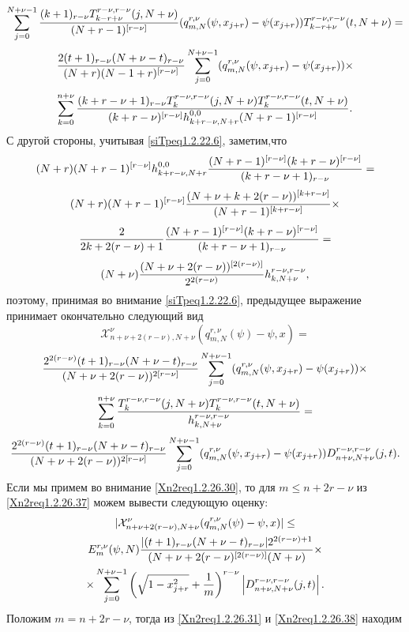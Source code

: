 $$
        \sum_{j=0}^{N+\nu-1}{(k+1)_{r-\nu}T_{k-r+\nu}^{r-\nu,r-\nu}(j,N+\nu)\over (N+r-1)^{[r-\nu]}}(q_{m,N}^{r,\nu}(\psi,x_{j+r})-\psi(x_{j+r}))
T_{k-r+\nu}^{r-\nu,r-\nu}(t,N+\nu)=
$$
$$
{2(t+1)_{r-\nu}(N+\nu-t)_{r-\nu}\over(N+r) (N-1+r)^{[r-\nu]}}\sum_{j=0}^{N+\nu-1}(q_{m,N}^{r,\nu}(\psi,x_{j+r})-\psi(x_{j+r}))\times
$$
\begin{equation}\label{Xn2req1.2.26.36}
\sum_{k=0}^{n+\nu} {(k+r-\nu+1)_{r-\nu}T_{k}^{r-\nu,r-\nu}(j,N+\nu)T_{k}^{r-\nu,r-\nu}(t,N+\nu)\over (k+r-\nu)^{[r-\nu]}h_{k+r-\nu,N+r}^{0,0}(N+r-1)^{[r-\nu]}}.
\end{equation}
С другой стороны, учитывая \eqref{siTpeq1.2.22.6}, заметим,что
$$
(N+r)(N+r-1)^{[r-\nu]}h_{k+r-\nu,N+r}^{0,0}{(N+r-1)^{[r-\nu]}(k+r-\nu)^{[r-\nu]}\over(k+r-\nu+1)_{r-\nu}}=
$$
$$
(N+r)(N+r-1)^{[r-\nu]}{(N+\nu+k+2(r-\nu))^{[k+r-\nu]}\over
(N+r-1)^{[k+r-\nu]}}\times
$$
$$
{2\over 2k+2(r-\nu)+1}{(N+r-1)^{[r-\nu]}(k+r-\nu)^{[r-\nu]}\over(k+r-\nu+1)_{r-\nu}}=
$$
$$
(N+\nu){(N+\nu+2(r-\nu))^{[2(r-\nu)]}\over2^{2(r-\nu)}}h_{k,N+\nu}^{r-\nu,r-\nu},
$$
поэтому, принимая во внимание \eqref{siTpeq1.2.22.6}, предыдущее выражение принимает
окончательно следующий вид
$$
\mathcal{X}^\nu_{n+\nu+2(r-\nu),N+\nu}(q_{m,N}^{r,\nu}(\psi)-\psi,x)=
$$
$$
{2^{2(r-\nu)}(t+1)_{r-\nu}(N+\nu-t)_{r-\nu}\over (N+\nu+2(r-\nu))^{2[r-\nu]}}\sum_{j=0}^{N+\nu-1}(q_{m,N}^{r,\nu}(\psi,x_{j+r})-\psi(x_{j+r}))\times
$$
$$
\sum_{k=0}^{n+\nu} {T_{k}^{r-\nu,r-\nu}(j,N+\nu)T_{k}^{r-\nu,r-\nu}(t,N+\nu)\over h_{k,N+\nu}^{r-\nu,r-\nu}}=
$$
\begin{equation}\label{Xn2req1.2.26.37}
{2^{2(r-\nu)}(t+1)_{r-\nu}(N+\nu-t)_{r-\nu}\over (N+\nu+2(r-\nu))^{2[r-\nu]}}\sum_{j=0}^{N+\nu-1}(q_{m,N}^{r,\nu}(\psi,x_{j+r})-\psi(x_{j+r}))D_{n+\nu,N+\nu}^{r-\nu,r-\nu}(j,t).
\end{equation}
 Если мы примем во внимание \eqref{Xn2req1.2.26.30}, то для $m\le n+2r-\nu $ из \eqref{Xn2req1.2.26.37} можем вывести следующую  оценку:
\begin{multline}\label{Xn2req1.2.26.38}
 |\mathcal{X}^\nu_{n+\nu+2(r-\nu),N+\nu}(q_{m,N}^{r,\nu}(\psi)-\psi,x)|\le \\
 E_m^{r,\nu}(\psi,N){|(t+1)_{r-\nu}(N+\nu-t)_{r-\nu}|2^{2(r-\nu)+1}\over(N+\nu+2(r-\nu)^{[2(r-\nu)]}(N+\nu)} \times \\
\times\sum_{j=0}^{N+\nu
-1}\left(\sqrt{1-x_{j+r}^2}+{1\over m}\right)^{r-\nu}\left|D_{n+\nu,N+\nu}^{r-\nu,r-\nu}(j,t)\right|.
\end{multline}
Положим $m=n+2r-\nu$, тогда из  \eqref{Xn2req1.2.26.31} и \eqref{Xn2req1.2.26.38} находим
